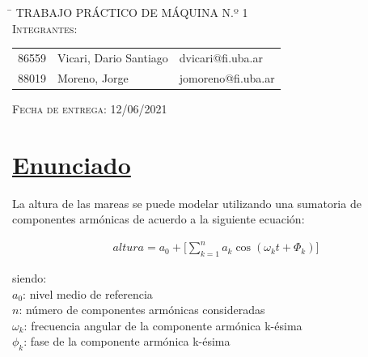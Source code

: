\documentclass[10pt,a4paper]{article}
\numberwithin{equation}{section}
\numberwithin{figure}{section}
\numberwithin{table}{section}
\begin{document}
\begin{titlepage}
	\vspace*{5mm}

	\begin{large}
			
	\begin{tabbing}
		\hspace{15mm} \= \+	
		\textsc{TRABAJO PRÁCTICO DE MÁQUINA N.º 1}\\
		
         
		\textsc{Integrantes:}\\
	
	
		\begin{tabular}{ l l l }
			
          
			
            
             86559 & Vicari, Dario Santiago		&  dvicari@fi.uba.ar\\
             88019 & Moreno, Jorge              &  jomoreno@fi.uba.ar\\
             

		\end{tabular}
	 
	\end{tabbing}
	
	\end{large}
	
	\hspace{15mm} \textsc{Fecha de entrega:} 12/06/2021  	\hspace{15mm} 
	
\end{titlepage}


\setcounter{page}{1}


\section{\underline{Enunciado}}

La altura de las mareas se puede modelar utilizando una sumatoria de componentes armónicas de acuerdo a la siguiente ecuación:

\begin{equation}\label{eq_1}
\begin{split}
altura = a_0 + \Big[\sum_{k=1}^{n} a_k  \cos(\omega_k t + \Phi_k)\Big] 
\end{split}
\end{equation}


siendo:\\
$a_0$: nivel medio de referencia\\
$n$: número de componentes armónicas consideradas\\
$\omega_k$: frecuencia angular de la componente armónica k-ésima\\
$\phi_k$: fase de la componente armónica k-ésima\\
\end{document}
